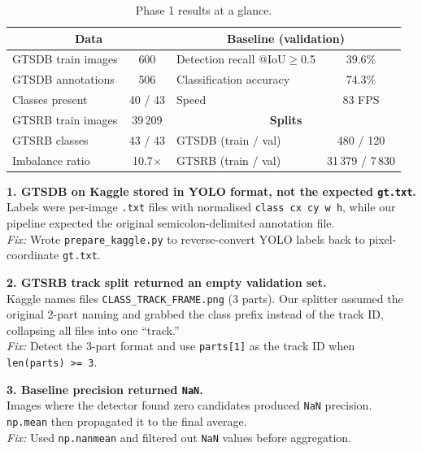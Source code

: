 \documentclass[12pt,a4paper]{article}
\begin{document}
\begin{table}[H]
\centering\small
\renewcommand{\arraystretch}{1.3}
\caption{Phase 1 results at a glance.}
\begin{tabular}{l c | l c}
\toprule
\multicolumn{2}{c|}{\textbf{Data}} & \multicolumn{2}{c}{\textbf{Baseline (validation)}} \\
\midrule
GTSDB train images       & 600                & Detection recall @IoU$\geq$0.5 & 39.6\%  \\
GTSDB annotations        & 506                & Classification accuracy         & 74.3\%  \\
Classes present           & 40 / 43            & Speed                           & 83 FPS  \\
\midrule
GTSRB train images        & 39\,209           & \multicolumn{2}{c}{\textbf{Splits}} \\
GTSRB classes             & 43 / 43           & GTSDB (train / val) & 480 / 120 \\
Imbalance ratio           & 10.7$\times$      & GTSRB (train / val) & 31\,379 / 7\,830 \\
\bottomrule
\end{tabular}
\end{table}

\begin{problembox}[title={Problems Encountered \& Fixes}]

\textbf{1. GTSDB on Kaggle stored in YOLO format, not the expected \texttt{gt.txt}.}\\
Labels were per-image \texttt{.txt} files with normalised \texttt{class cx cy w h}, while our pipeline expected the original semicolon-delimited annotation file.\\
\textit{Fix:} Wrote \texttt{prepare\_kaggle.py} to reverse-convert YOLO labels back to pixel-coordinate \texttt{gt.txt}.

\medskip{}\medskip

\textbf{2. GTSRB track split returned an empty validation set.}\\
Kaggle names files \texttt{CLASS\_TRACK\_FRAME.png} (3 parts). Our splitter assumed the original 2-part naming and grabbed the class prefix instead of the track ID, collapsing all files into one ``track.''\\
\textit{Fix:} Detect the 3-part format and use \texttt{parts[1]} as the track ID when \texttt{len(parts) >= 3}.

\medskip{}\medskip

\textbf{3. Baseline precision returned \texttt{NaN}.}\\
Images where the detector found zero candidates produced \texttt{NaN} precision. \texttt{np.mean} then propagated it to the final average.\\
\textit{Fix:} Used \texttt{np.nanmean} and filtered out \texttt{NaN} values before aggregation.

\end{problembox}
\end{document}
